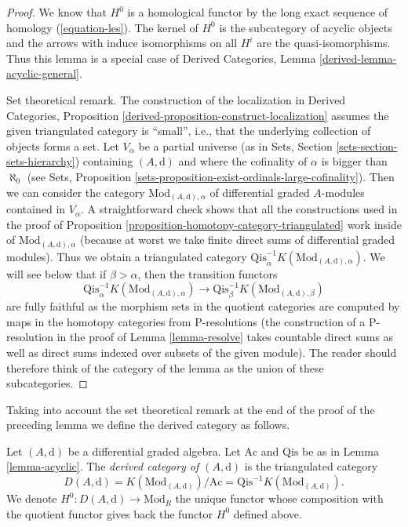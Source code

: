 \begin{proof}
We know that $H^0$ is a homological functor by the long exact
sequence of homology (\ref{equation-les}).
The kernel of $H^0$ is the subcategory of acyclic objects and
the arrows with induce isomorphisms on all $H^i$ are the
quasi-isomorphisms. Thus this lemma is a special case of
Derived Categories, Lemma \ref{derived-lemma-acyclic-general}.

\medskip\noindent
Set theoretical remark. The construction of the localization in
Derived Categories, Proposition
\ref{derived-proposition-construct-localization}
assumes the given triangulated category is ``small'', i.e., that the
underlying collection of objects forms a set. Let $V_\alpha$ be a
partial universe (as in Sets, Section \ref{sets-section-sets-hierarchy})
containing $(A, \text{d})$ and where the cofinality of $\alpha$
is bigger than $\aleph_0$
(see Sets, Proposition \ref{sets-proposition-exist-ordinals-large-cofinality}).
Then we can consider the category $\text{Mod}_{(A, \text{d}), \alpha}$
of differential graded $A$-modules contained in $V_\alpha$.
A straightforward check shows that all the constructions used in
the proof of Proposition \ref{proposition-homotopy-category-triangulated}
work inside of $\text{Mod}_{(A, \text{d}), \alpha}$
(because at worst we take finite direct sums of differential graded modules).
Thus we obtain a triangulated category
$\text{Qis}_\alpha^{-1}K(\text{Mod}_{(A, \text{d}), \alpha})$.
We will see below that if $\beta > \alpha$, then the transition functors
$$
\text{Qis}_\alpha^{-1}K(\text{Mod}_{(A, \text{d}), \alpha})
\longrightarrow
\text{Qis}_\beta^{-1}K(\text{Mod}_{(A, \text{d}), \beta})
$$
are fully faithful as the morphism sets in the quotient categories
are computed by maps in the homotopy categories from P-resolutions
(the construction of a P-resolution in the proof of Lemma \ref{lemma-resolve}
takes countable direct sums as well as direct sums indexed over subsets
of the given module). The reader should therefore think of the category
of the lemma as the union of these subcategories.
\end{proof}

\noindent
Taking into account the set theoretical remark at the end of the
proof of the preceding lemma we define the derived category as follows.

\begin{definition}
\label{definition-unbounded-derived-category}
Let $(A, \text{d})$ be a differential graded algebra.
Let $\text{Ac}$ and $\text{Qis}$ be as in Lemma \ref{lemma-acyclic}.
The {\it derived category of $(A, \text{d})$} is the triangulated
category
$$
D(A, \text{d}) =
K(\text{Mod}_{(A, \text{d})})/\text{Ac} =
\text{Qis}^{-1}K(\text{Mod}_{(A, \text{d})}).
$$
We denote $H^0 : D(A, \text{d}) \to \text{Mod}_R$ the unique functor
whose composition with the quotient functor gives back the functor
$H^0$ defined above.
\end{definition}

